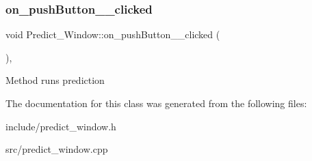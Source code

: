 \subsubsection{\texorpdfstring{on\+\_\+push\+Button\+\_\+\_\+clicked}{on\_pushButton\_2\_clicked}}
{\footnotesize\ttfamily void Predict\+\_\+\+Window\+::on\+\_\+push\+Button\+\_\+\_\+clicked (\begin{DoxyParamCaption}{ }\end{DoxyParamCaption})\hspace{0.3cm}{\ttfamily [private]}, {\ttfamily [slot]}}

Method runs prediction 

The documentation for this class was generated from the following files\+:\begin{DoxyCompactItemize}
\item 
include/predict\+\_\+window.\+h\item 
src/predict\+\_\+window.\+cpp\end{DoxyCompactItemize}
